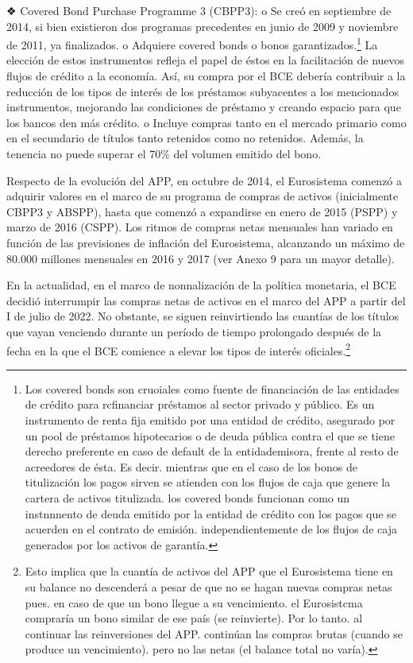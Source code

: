 \documentclass[10pt,a4paper]{article}
\begin{document}
{❖ Covered Bond Purchase Programme 3 (CBPP3): o Se creó en septiembre de 2014, si bien existieron dos programas precedentes en junio de 2009 y noviembre de 2011, ya finalizados. o Adquiere covered bonds o bonos garantizados.\footnote{%
    Los covered bonds son cruoiales como fuente de financiación de las entidades de crédito para rcfinanciar préstamos al sector privado y público. Es un instrumento de renta fija emitido por una entidad de crédito, asegurado por un pool de préstamos hipotecarios o de deuda pública contra el que se tiene derecho preferente en caso de default de la entidademisora, frente al resto de acreedores de ésta. Es decir. mientras que en el caso de los bonos de titulización los pagos sirven se atienden con los flujos de caja que genere la cartera de activos titulizada. los covered bonds funcionan como un instnnnento de deuda emitido por la entidad de crédito con los pagos que se acuerden en el contrato de emisión. independientemente de los flujos de caja generados por los activos de garantía.
} La elección de estos instrumentos  refleja el papel de éstos en la facilitación de nuevos flujos de crédito a la economía. Así, su compra por el BCE debería contribuir a la reducción de los tipos de interés de los préstamos subyacentes a los mencionados instrumentos, mejorando las condiciones de préstamo y creando espacio para que los bancos den más crédito. o Incluye compras tanto en el mercado primario como en el secundario de títulos tanto retenidos como no retenidos. Además, la tenencia no puede superar el 70\% del volumen emitido del bono. 

Respecto de la evolución del APP, en octubre de 2014, el Eurosistema comenzó a adquirir valores en el marco de su programa de compras de activos (inicialmente CBPP3 y ABSPP), hasta que comenzó a expandirse en enero de 2015 (PSPP) y marzo de 2016 (CSPP). Los ritmos de compras netas mensuales han variado en función de las previsiones de inflación del Eurosistema, alcanzando un máximo de 80.000 millones mensuales en 2016 y 2017 (ver Anexo 9 para un mayor detalle).

En la actualidad, en el marco de nonnalización de la política monetaria, el BCE decidió interrumpir las compras netas de activos en el marco del APP a partir del I de julio de 2022. No obstante, se siguen reinvirtiendo las cuantías de los títulos que vayan venciendo durante un período de tiempo prolongado después de la fecha en la que el BCE comience a elevar los tipos de interés oficiales.\footnote{%
    Esto implica que la cuantía de activos del APP que el Eurosistema tiene en su balance no descenderá a pesar de que no se hagan nuevas compras netas pues. en caso de que un bono llegue a su vencimiento. el Eurosistcma compraría un bono similar de ese país (se reinvierte). Por lo tanto. al continuar las reinversiones del APP. continúan las compras brutas (cuando se produce un vencimiento). pero no las netas (el balance total no varía).
}

}
\end{document}
